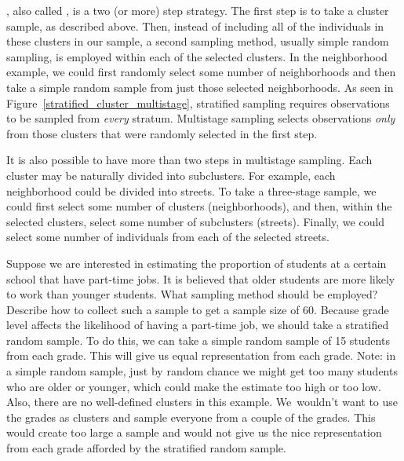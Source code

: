 , also called , is a two (or more) step strategy. The first step is to take a cluster sample, as described above. Then, instead of including all of the individuals in these clusters in our sample, a second sampling method, usually simple random sampling, is employed within each of the selected clusters. In the neighborhood example, we could first randomly select some number of neighborhoods and then take a simple random sample from just those selected neighborhoods. As seen in Figure~\ref{stratified_cluster_multistage}, stratified sampling requires observations to be sampled from \emph{every} stratum. Multistage sampling selects observations \emph{only} from those clusters that were randomly selected in the first step.

It is also possible to have more than two steps in multistage sampling. Each cluster may be naturally divided into subclusters. For example, each neighborhood could be divided into streets. To take a three-stage sample, we could first select some number of clusters (neighborhoods), and then, within the selected clusters, select some number of subclusters (streets). Finally, we could select some number of individuals from each of the selected streets.

\begin{examplewrap}
\begin{nexample}{Suppose we are interested in estimating the proportion of students at a certain school that have part-time jobs. It is believed that older students are more likely to work than younger students. What sampling method should be employed? Describe how to collect such a sample to get a sample size of 60.}
Because grade level affects the likelihood of having a part-time job, we should take a stratified random sample. To do this, we can take a simple random sample of 15 students from each grade. This will give us equal representation from each grade. Note: in a simple random sample, just by random chance we might get too many students who are older or younger, which could make the estimate too high or too low. Also, there are no well-defined clusters in this example. We~wouldn't want to use the grades as clusters and sample everyone from a couple of the grades. This would create too large a sample and would not give us the nice representation from each grade afforded by the stratified random sample.
\end{nexample}
\end{examplewrap}

